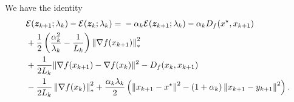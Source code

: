 \documentclass[10pt]{amsart}
\begin{document}
\begin{lemma}We have the identity
 	\begin{equation*}
		\begin{split}
&\mathcal E(\boldsymbol z_{k+1}; \lambda_{k}) - \mathcal E(\boldsymbol z_k; \lambda_k) 
			= {} -\alpha_k\mathcal E(\boldsymbol z_{k+1}; \lambda_{k})  - \alpha_k D_f(x^{\star}, x_{k+1})\\
			&  +\frac{1}{2}\left ( \frac{\alpha_k^2}{\lambda_k}  - \frac{1}{L_k}\right )\left\lVert {\nabla f(x_{k+1})} \right\rVert_*^2			\\
			& +\frac{1}{2L_k}\| \nabla f(x_{k+1}) - \nabla f(x_k) \|^2 - D_f(x_{k}, x_{k+1})\\
			& -\frac{1}{2L_k}\left\lVert {\nabla f(x_k)} \right\rVert_*^2+ \frac{\alpha_k\lambda_k}{2}\left (\left\lVert {x_{k+1}-x^{\star}} \right\rVert^2 - (1+\alpha_k)\left\lVert {x_{k+1}-y_{k+1}} \right\rVert^2\right ).
		\end{split}
	\end{equation*}
\end{lemma}
\end{document}
